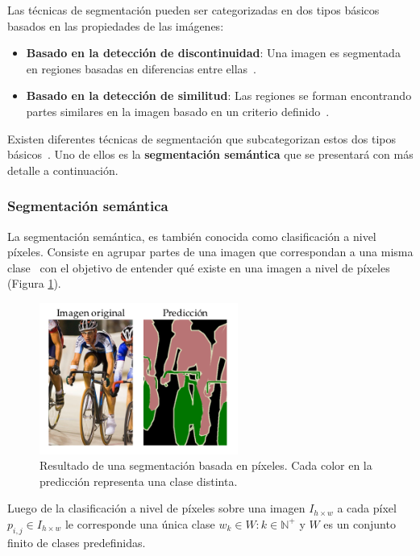 Las técnicas de segmentación pueden ser categorizadas en dos tipos básicos basados en las propiedades de las imágenes:

\begin{itemize}
	\item \textbf{Basado en la detección de discontinuidad}: Una imagen es segmentada en regiones basadas en diferencias entre ellas~\cite{sundararajan2017digital}.
	\item \textbf{Basado en la detección de similitud}: Las regiones se forman encontrando partes similares en la imagen basado en un criterio definido~\cite{sundararajan2017digital}.
\end{itemize}

Existen diferentes técnicas de segmentación que subcategorizan estos dos tipos básicos~\cite{anjna2017review}. Uno de ellos es la \textbf{segmentación semántica} que se presentará con más detalle a continuación.

\subsubsection{Segmentación semántica}

La segmentación semántica, es también conocida como clasificación a nivel píxeles. Consiste en agrupar partes de una imagen que correspondan a una misma clase~\cite{thoma2016survey} con el objetivo de entender qué existe en una imagen a nivel de píxeles (Figura \ref{fig:semseg}).

\begin{figure}[ht]
	\centering
	\includegraphics[width=6.5cm]{./Graphics/semseg.png}
	\caption{Resultado de una segmentación basada en píxeles. Cada color en la predicción representa una clase distinta.}
	\label{fig:semseg}
\end{figure}

\begin{property}
	Luego de la clasificación a nivel de píxeles sobre una imagen $I_{h \times w}$ a cada píxel $p_{i, j} \in I_{h \times w}$ le corresponde una única clase $w_k \in W: k \in \mathbb{N}^+$ y $W$ es un conjunto finito de clases predefinidas.
\end{property}

